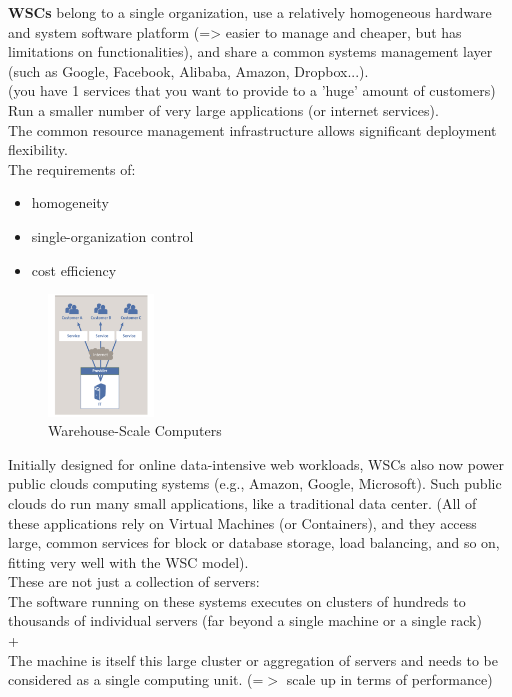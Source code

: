 \documentclass[10pt, oneside]{article}
\begin{document}
{\bf WSCs} belong to a single organization, use a relatively homogeneous hardware and system software platform (=> easier to manage and cheaper, but has limitations on functionalities), and share a common systems management layer (such as Google, Facebook, Alibaba, Amazon, Dropbox...).\\
(you have 1 services that you want to provide to a 'huge' amount of customers)\\
Run a smaller number of very large applications (or internet services).\\
The common resource management infrastructure allows significant deployment flexibility.\\
The requirements of:
\begin{itemize}
    \item homogeneity
    \item single-organization control
    \item cost efficiency
\end{itemize}
\begin{figure}[H]
    \begin{center}
    \includegraphics[width=0.25\textwidth]{img/img5.png}
    \caption{Warehouse-Scale Computers}
    \label{fig:WSCs}
    \end{center}
\end{figure}
Initially designed for online data-intensive web workloads, WSCs also now power public clouds computing systems (e.g., Amazon, Google, Microsoft). Such public clouds do run many small applications, like a traditional data center. (All of these applications rely on Virtual Machines (or Containers), and they access large, common services for block or database storage, load balancing, and so on, fitting very well with the WSC model).\\
These are not just a collection of servers: \\The software running on these systems executes on clusters of hundreds to thousands of individual servers (far beyond a single machine or a single rack)\\
+ \\The machine is itself this large cluster or aggregation of servers and needs to be considered as a single computing unit. (=$>$ scale up in terms of performance)\\
\end{document}
